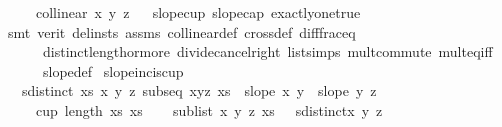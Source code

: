 \begin{isabellebody}
\ \ \ \ \ {\isachardoublequoteopen}collinear{}\ x\ y\ z{\isachardoublequoteclose}%
\isadelimproof
\ %
\endisadelimproof
%
\isatagproof
{}\isamarkupfalse%
\ slope{\isacharunderscore}{\kern0pt}cup{}\ slope{\isacharunderscore}{\kern0pt}cap{}\ exactly{\isacharunderscore}{\kern0pt}one{\isacharunderscore}{\kern0pt}true\isanewline
\ \ \isamarkupfalse%
\ {\isacharparenleft}{\kern0pt}smt\ {\isacharparenleft}{\kern0pt}verit{\isacharcomma}{\kern0pt}\ del{\isacharunderscore}{\kern0pt}insts{\isacharparenright}{\kern0pt}\ assms{\isacharparenleft}{\kern0pt}{}{\isacharcomma}{\kern0pt}{}{\isacharparenright}{\kern0pt}\ collinear{}{\isacharunderscore}{\kern0pt}def\ cross{}{\isacharunderscore}{\kern0pt}def\ diff{\isacharunderscore}{\kern0pt}frac{\isacharunderscore}{\kern0pt}eq\isanewline
\ \ \ \ \ \ distinct{\isacharunderscore}{\kern0pt}length{\isacharunderscore}{\kern0pt}{}{\isacharunderscore}{\kern0pt}or{\isacharunderscore}{\kern0pt}more\ divide{\isacharunderscore}{\kern0pt}cancel{\isacharunderscore}{\kern0pt}right\ list{\isachardot}{\kern0pt}simps{\isacharparenleft}{\kern0pt}{}{\isacharparenright}{\kern0pt}\ mult{\isachardot}{\kern0pt}commute\ mult{\isacharunderscore}{\kern0pt}eq{\isacharunderscore}{\kern0pt}{}{\isacharunderscore}{\kern0pt}iff\isanewline
\ \ \ \ \ \ slope{\isacharunderscore}{\kern0pt}def{\isacharparenright}{\kern0pt}%
\endisatagproof
{\isafoldproof}%
%
\isadelimproof
%
\endisadelimproof
\isanewline
\isanewline
{}\isamarkupfalse%
\ slopeinc{\isacharunderscore}{\kern0pt}is{\isacharunderscore}{\kern0pt}cup{\isacharcolon}{\kern0pt}\isanewline
\ \ \ {\isachardoublequoteopen}sdistinct\ xs{\isachardoublequoteclose}\ {\isachardoublequoteopen}{\isasymforall}x\ y\ z{\isachardot}{\kern0pt}\ subseq\ {\isacharbrackleft}{\kern0pt}x{\isacharcomma}{\kern0pt}y{\isacharcomma}{\kern0pt}z{\isacharbrackright}{\kern0pt}\ xs\ {\isasymlongrightarrow}\ slope\ x\ y\ {\isacharless}{\kern0pt}\ slope\ y\ z{\isachardoublequoteclose}\isanewline
\ \ \ \ \ {\isachardoublequoteopen}cup\ {\isacharparenleft}{\kern0pt}length\ xs{\isacharparenright}{\kern0pt}\ xs{\isachardoublequoteclose}\isanewline
%
\isadelimproof
%
\endisadelimproof
%
\isatagproof
{}\isamarkupfalse%
{\isacharminus}{\kern0pt}\isanewline
\ \ \isamarkupfalse%
\ {\isachardoublequoteopen}sublist\ {\isacharbrackleft}{\kern0pt}x{\isacharcomma}{\kern0pt}\ y{\isacharcomma}{\kern0pt}\ z{\isacharbrackright}{\kern0pt}\ xs\ \ {\isasymlongrightarrow}\ sdistinct{\isacharbrackleft}{\kern0pt}x{\isacharcomma}{\kern0pt}\ y{\isacharcomma}{\kern0pt}\ z{\isacharbrackright}{\kern0pt}{\isachardoublequoteclose}\isanewline

\end{isabellebody}
